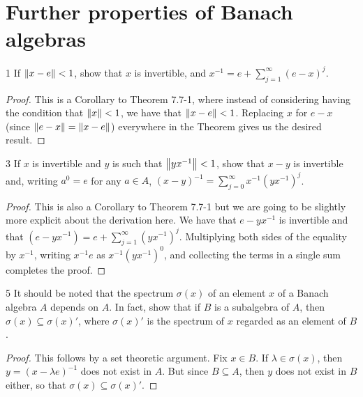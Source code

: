 \section{Further properties of Banach algebras}


\begin{exercise}{1}
If $\left\lVert x - e\right\rVert < 1$, show that $x$ is invertible, and $x^{-1} = e + \sum_{j=1}^\infty (e - x)^j$.
\end{exercise}
\begin{proof}
This is a Corollary to Theorem 7.7-1, where instead of considering having the condition that $\left\lVert x\right\rVert < 1$, we have that $\left\lVert x - e\right\rVert < 1$.
Replacing $x$ for $e - x$ (since $\left\lVert e - x\right\rVert = \left\lVert x - e\right\rVert$) everywhere in the Theorem gives us the desired result.
\end{proof} 

\begin{exercise}{3}
If $x$ is invertible and $y$ is such that $\left\lVert y x^{-1}\right\rVert < 1$, show that $x - y$ is invertible and, writing $a^0  = e$ for any $a \in A$, $(x - y)^{-1} = \sum_{j=0}^\infty x^{-1} (y x^{-1})^j$.
\end{exercise}
\begin{proof}
This is also a Corollary to Theorem 7.7-1 but we are going to be slightly more explicit about the derivation here.
We have that $e - y x^{-1}$ is invertible and that $(e - y x^{-1}) = e + \sum_{j=1}^\infty (y x^{-1})^j$.
Multiplying both sides of the equality by $x^{-1}$, writing $x^{-1}e$ as $x^{-1} (y x^{-1})^0$, and collecting the terms in a single sum completes the proof.
\end{proof} 

\begin{exercise}{5}
It should be noted that the spectrum $\sigma(x)$ of an element $x$ of a Banach algebra $A$ depends on $A$.
In fact, show that if $B$ is a subalgebra of $A$, then $\sigma(x) \subseteq \sigma(x)'$, where $\sigma(x)'$ is the spectrum of $x$ regarded as an element of $B$.
\end{exercise}
\begin{proof}
This follows by a set theoretic argument.
Fix $x \in B$.
If $\lambda \in \sigma(x)$, then $y = (x - \lambda e)^{-1}$ does not exist in $A$.
But since $B \subseteq A$, then $y$ does not exist in $B$ either, so that $\sigma(x) \subseteq \sigma(x)'$.
\end{proof} 

